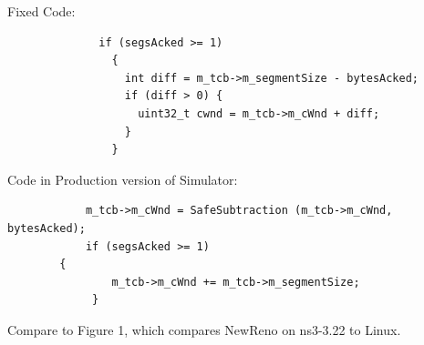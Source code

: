 Fixed Code:

\begin{verbatim}
              if (segsAcked >= 1)
                {
                  int diff = m_tcb->m_segmentSize - bytesAcked;
                  if (diff > 0) {
                    uint32_t cwnd = m_tcb->m_cWnd + diff;
                  }
                }
\end{verbatim}

Code in Production version of Simulator:

\begin{verbatim}
            m_tcb->m_cWnd = SafeSubtraction (m_tcb->m_cWnd, bytesAcked);
            if (segsAcked >= 1)
	    {
                m_tcb->m_cWnd += m_tcb->m_segmentSize;
             }
\end{verbatim}


Compare to \cite{NS3Val} Figure 1, which compares NewReno on ns3-3.22 to Linux.


\begin{figure}[h!]
\begin{center}
\end{center}
\caption{}
\label{fig:NS3Val}
\end{figure}


\cite{SACK}
\cite{NS2WP}
\cite{NS2Val}
\cite{NS2Linux}

\cite{NS2TCPQ}

\cite{LinuxTCP}
\cite{RFC2582}
\cite{RFC6582}

{\small {}
}

